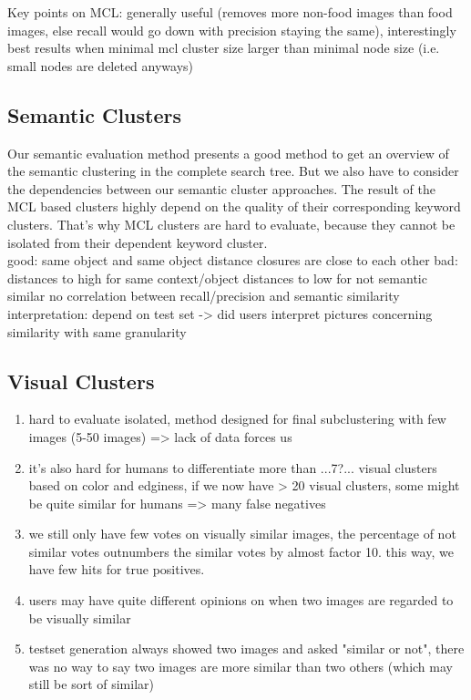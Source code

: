 \bigskip
Key points on MCL: generally useful (removes more non-food images than food images, else recall would go down with precision staying the same), interestingly best results when minimal mcl cluster size larger than minimal node size (i.e. small nodes are deleted anyways)

\subsection{Semantic Clusters}
Our semantic evaluation method presents a good method to get an overview of the semantic clustering in the complete search tree. But we also have to consider the dependencies between our semantic cluster approaches. The result of the MCL based clusters highly depend on the quality of their corresponding keyword clusters. That's why MCL clusters are hard to evaluate, because they cannot be isolated from their dependent keyword cluster.\\	
\bigskip
good: same object and same object distance closures are close to each other
bad: distances to high for same context/object 
	 distances to low for not semantic similar
	 no correlation between recall/precision and semantic similarity 
interpretation: depend on test set -> did users interpret pictures concerning similarity with same granularity

\subsection{Visual Clusters}

\begin{enumerate}
\item hard to evaluate isolated, method designed for final subclustering with few images (5-50 images) => lack of data forces us
\item it's also hard for humans to differentiate more than ...7?... visual clusters based on color and edginess, if we now have > 20 visual clusters, some might be quite similar for humans => many false negatives
\item we still only have few votes on visually similar images, the percentage of not similar votes outnumbers the similar votes by almost factor 10. this way, we have few hits for true positives.
\item users may have quite different opinions on when two images are regarded to be visually similar
\item testset generation always showed two images and asked "similar or not", there was no way to say two images are more similar than two others (which may still be sort of similar)
\end{enumerate}
